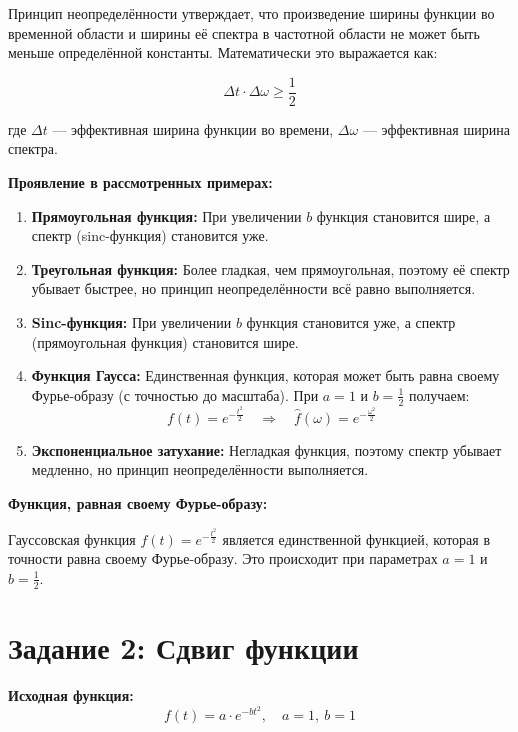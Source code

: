 Принцип неопределённости утверждает, что произведение ширины функции во временной области и ширины её спектра в частотной области не может быть меньше определённой константы. Математически это выражается как:

\[
\Delta t \cdot \Delta \omega \geq \frac{1}{2}
\]

где $\Delta t$ — эффективная ширина функции во времени, $\Delta \omega$ — эффективная ширина спектра.

\textbf{Проявление в рассмотренных примерах:}

\begin{enumerate}
    \item \textbf{Прямоугольная функция:} При увеличении $b$ функция становится шире, а спектр (sinc-функция) становится уже.
    
    \item \textbf{Треугольная функция:} Более гладкая, чем прямоугольная, поэтому её спектр убывает быстрее, но принцип неопределённости всё равно выполняется.
    
    \item \textbf{Sinc-функция:} При увеличении $b$ функция становится уже, а спектр (прямоугольная функция) становится шире.
    
    \item \textbf{Функция Гаусса:} Единственная функция, которая может быть равна своему Фурье-образу (с точностью до масштаба). При $a = 1$ и $b = \frac{1}{2}$ получаем:
    \[
    f(t) = e^{-\frac{t^2}{2}} \quad \Rightarrow \quad \hat{f}(\omega) = e^{-\frac{\omega^2}{2}}
    \]
    
    \item \textbf{Экспоненциальное затухание:} Негладкая функция, поэтому спектр убывает медленно, но принцип неопределённости выполняется.
\end{enumerate}

\textbf{Функция, равная своему Фурье-образу:}

Гауссовская функция $f(t) = e^{-\frac{t^2}{2}}$ является единственной функцией, которая в точности равна своему Фурье-образу. Это происходит при параметрах $a = 1$ и $b = \frac{1}{2}$.

\section*{Задание 2: Сдвиг функции}

\textbf{Исходная функция:}
\[
f(t) = a \cdot e^{-b t^2}, \quad a = 1, \ b = 1
\]

